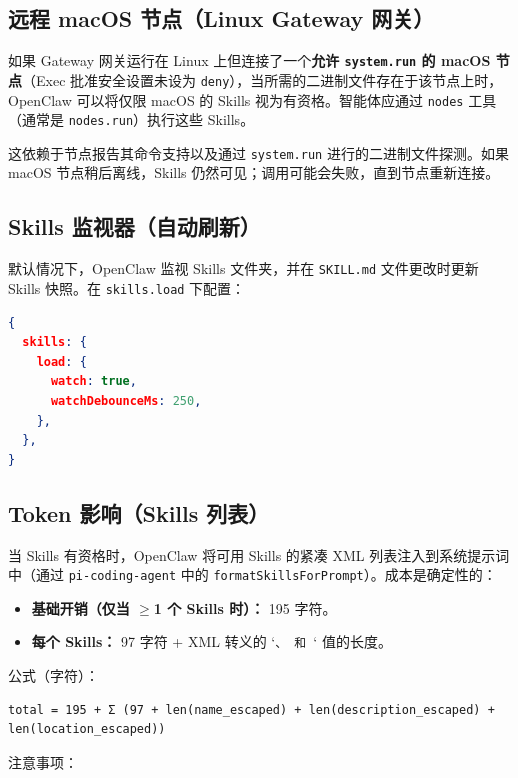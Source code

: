\subsection{远程 macOS 节点（Linux Gateway 网关）}


如果 Gateway 网关运行在 Linux 上但连接了一个\textbf{允许 \texttt{system.run} 的 macOS 节点}（Exec 批准安全设置未设为 \texttt{deny}），当所需的二进制文件存在于该节点上时，OpenClaw 可以将仅限 macOS 的 Skills 视为有资格。智能体应通过 \texttt{nodes} 工具（通常是 \texttt{nodes.run}）执行这些 Skills。

这依赖于节点报告其命令支持以及通过 \texttt{system.run} 进行的二进制文件探测。如果 macOS 节点稍后离线，Skills 仍然可见；调用可能会失败，直到节点重新连接。

\subsection{Skills 监视器（自动刷新）}


默认情况下，OpenClaw 监视 Skills 文件夹，并在 \texttt{SKILL.md} 文件更改时更新 Skills 快照。在 \texttt{skills.load} 下配置：

\begin{lstlisting}[language=json]
{
  skills: {
    load: {
      watch: true,
      watchDebounceMs: 250,
    },
  },
}
\end{lstlisting}


\subsection{Token 影响（Skills 列表）}


当 Skills 有资格时，OpenClaw 将可用 Skills 的紧凑 XML 列表注入到系统提示词中（通过 \texttt{pi-coding-agent} 中的 \texttt{formatSkillsForPrompt}）。成本是确定性的：

\begin{itemize}
  \item \textbf{基础开销（仅当 $\geq$1 个 Skills 时）：} 195 字符。
  \item \textbf{每个 Skills：} 97 字符 + XML 转义的 `\texttt{、}\texttt{ 和 }` 值的长度。
\end{itemize}


公式（字符）：

\begin{lstlisting}
total = 195 + Σ (97 + len(name_escaped) + len(description_escaped) + len(location_escaped))
\end{lstlisting}


注意事项：

